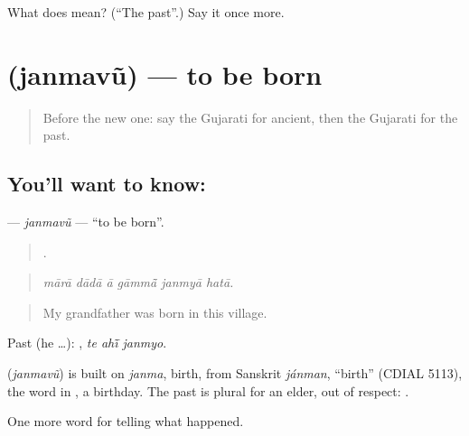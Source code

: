 \begin{tcolorbox}[breakable,colback=teal!4,colframe=teal!35!black,title={Before you move on}]
What does  mean? (\textquotedblleft{}The past\textquotedblright{}.) Say it once more.
\end{tcolorbox}
\section[\texorpdfstring{\gu{જન્મવું} (janmavũ)}{જન્મવું (janmavũ)}]{ (janmavũ) — to be born}

\label{lesson:GU-C317-janmavu}



\begin{quote}
Before the new one: say the Gujarati for ancient, then the Gujarati for the past.
\end{quote}

\subsection*{You'll want to know: }
\textbf{} — \emph{janmavũ} — \textquotedblleft{}to be born\textquotedblright{}.

\begin{quote}
     .
\end{quote}

\begin{quote}
\emph{mārā dādā ā gāmmā̃ janmyā hatā.}
\end{quote}

\begin{quote}
My grandfather was born in this village.
\end{quote}

Past (he …):   , \emph{te ahī̃ janmyo}.

\begin{cousinweb}
\textbf{} (\emph{janmavũ}) is built on \emph{janma}, birth, from Sanskrit \emph{jánman}, \textquotedblleft{}birth\textquotedblright{} (CDIAL 5113), the word in \textbf{}, a birthday. The past is plural for an elder, out of respect: \textbf{  }.
\end{cousinweb}

\begin{grammarlens}[title={What you've built}]
One more word for telling what happened.
\end{grammarlens}


